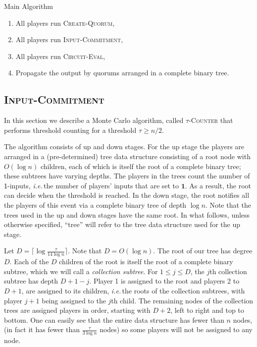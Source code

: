 \documentclass[10pt]{llncs}
\newcommand{\ie}{\emph{i.e.\,}}
\newcommand{\dcl}{D}
\newcommand{\oneinputs}{$\mathsf{1}$-inputs\xspace}
\newcommand{\tc}{\textsc{$\tau$-Counter}\xspace}
\newcommand{\cq}{\textsc{Create-Quorum}\xspace}
\newcommand{\ic}{\textsc{Input-Commitment}\xspace}
\newcommand{\ce}{\textsc{Circuit-Eval}\xspace}
\begin{document}
\begin{algorithm}
\caption{Main Algorithm}\label{alg:main}
\begin{enumerate}
\item All players run \cq,
\item All players run \ic,
\item All players run \ce,
\item Propagate the output by quorums arranged in a complete binary tree.
\end{enumerate}
\end{algorithm} 



\subsection{\ic} \label{sec:count}
In this section we describe a Monte Carlo algorithm,
called \tc that performs threshold counting for a threshold $\tau \ge n/2$. 

The algorithm consists of up and down stages. For the up stage
the players are arranged in a (pre-determined)  tree data structure 
consisting of a root node with $O(\log{n})$ children, each of which is 
itself the root of a complete binary tree; these subtrees have 
varying depths.  The players in the trees count the number of \oneinputs, 
\ie the number of players' inputs that are set to $\mathbf{1}$. As a
result, the root can decide when the threshold is reached. In the down stage, 
the root notifies all the players of this event via a complete 
binary tree of depth $\log n$. Note that the trees used in the up and down 
stages have the same root. In what follows, unless otherwise specified, 
``tree'' will refer to the  tree data structure used for the up stage.

 
Let $\dcl = \lceil \log{\frac{\tau}{14\log{n}}}\rceil$. Note that 
$\dcl = O(\log{n})$. The root of our tree has degree $\dcl$. Each of 
the $\dcl$ children of the root is itself the root of a complete 
binary subtree, which we will call a \emph{collection subtree}. 
For $1\le j\le D$, the $j$th collection subtree has depth $\dcl+1-j$. 
Player 1 is assigned to the root and players 2 to $D+1$, are assigned to its 
children, \ie the roots of the collection subtrees, with player $j+1$ being 
assigned to the $j$th child. The remaining nodes of the collection trees are 
assigned players in order, starting with $D+2$, left to right and top to 
bottom. One can easily see that the entire data structure has fewer than 
$n$ nodes, (in fact it has fewer than $\frac{\tau}{3\log{n}}$ nodes) so 
some players will not be assigned to any node. 
\end{document}
